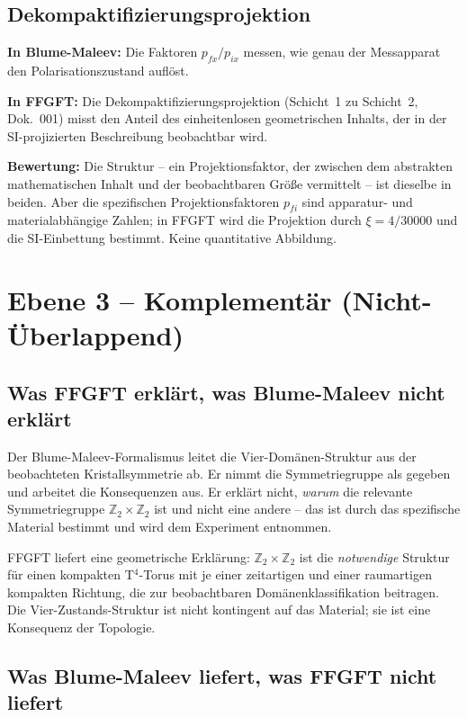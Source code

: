 \subsection{Dekompaktifizierungsprojektion}

\textbf{In Blume-Maleev:} Die Faktoren $p_{fx}/p_{ix}$ messen, wie genau
der Messapparat den Polarisationszustand auflöst.

\textbf{In FFGFT:} Die Dekompaktifizierungsprojektion (Schicht~1 zu Schicht~2,
Dok.~001) misst den Anteil des einheitenlosen geometrischen Inhalts, der in
der SI-projizierten Beschreibung beobachtbar wird.

\textbf{Bewertung:} Die Struktur -- ein Projektionsfaktor, der zwischen dem
abstrakten mathematischen Inhalt und der beobachtbaren Größe vermittelt -- ist
dieselbe in beiden. Aber die spezifischen Projektionsfaktoren $p_{fi}$ sind
apparatur- und materialabhängige Zahlen; in FFGFT wird die Projektion durch
$\xi = 4/30000$ und die SI-Einbettung bestimmt. Keine quantitative Abbildung.

\section{Ebene 3 -- Komplementär (Nicht-Überlappend)}

\subsection{Was FFGFT erklärt, was Blume-Maleev nicht erklärt}

Der Blume-Maleev-Formalismus leitet die Vier-Domänen-Struktur aus der
beobachteten Kristallsymmetrie ab. Er nimmt die Symmetriegruppe als gegeben
und arbeitet die Konsequenzen aus. Er erklärt nicht, \emph{warum} die
relevante Symmetriegruppe $\mathbb{Z}_2\times\mathbb{Z}_2$ ist und nicht eine
andere -- das ist durch das spezifische Material bestimmt und wird dem
Experiment entnommen.

FFGFT liefert eine geometrische Erklärung: $\mathbb{Z}_2\times\mathbb{Z}_2$
ist die \emph{notwendige} Struktur für einen kompakten T$^4$-Torus mit je
einer zeitartigen und einer raumartigen kompakten Richtung, die zur
beobachtbaren Domänenklassifikation beitragen. Die Vier-Zustands-Struktur
ist nicht kontingent auf das Material; sie ist eine Konsequenz der Topologie.

\subsection{Was Blume-Maleev liefert, was FFGFT nicht liefert}

